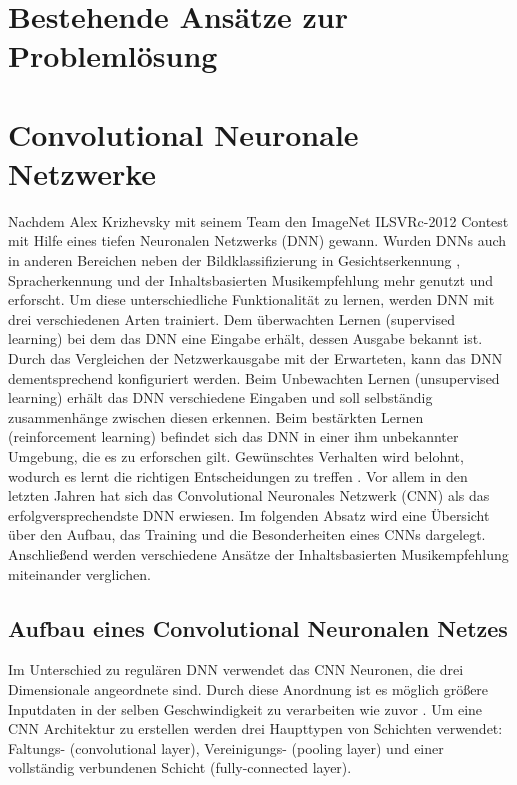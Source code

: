 \documentclass[twosided,a4,10pt]{article}
\begin{document}
\begin{multicols}{2}
\section{Bestehende Ansätze zur Problemlösung}



\section{Convolutional Neuronale Netzwerke}
Nachdem Alex Krizhevsky mit seinem Team den ImageNet ILSVRc-2012 Contest mit Hilfe eines tiefen Neuronalen Netzwerks (DNN) gewann. Wurden DNNs auch in anderen Bereichen neben der Bildklassifizierung \cite{alex} in Gesichtserkennung \cite{ding}, Spracherkennung \cite{graves} und der Inhaltsbasierten Musikempfehlung \cite{oord} mehr genutzt und erforscht.\newline
Um diese unterschiedliche Funktionalität zu lernen, werden DNN mit drei verschiedenen Arten trainiert. Dem überwachten Lernen (supervised learning) bei dem das DNN eine Eingabe erhält, dessen Ausgabe bekannt ist. Durch das Vergleichen der Netzwerkausgabe mit der Erwarteten, kann das DNN dementsprechend konfiguriert werden. Beim Unbewachten Lernen (unsupervised learning) erhält das DNN verschiedene Eingaben und soll selbständig zusammenhänge zwischen diesen erkennen. Beim bestärkten Lernen (reinforcement learning) befindet sich das DNN in einer ihm unbekannter Umgebung, die es zu erforschen gilt. Gewünschtes Verhalten wird belohnt, wodurch es lernt die richtigen Entscheidungen zu treffen \cite{wang2}.\newline 
Vor allem in den letzten Jahren hat sich das Convolutional Neuronales Netzwerk (CNN) als das erfolgversprechendste DNN erwiesen.\newline 
Im folgenden Absatz wird eine Übersicht über den Aufbau, das Training und die Besonderheiten eines CNNs dargelegt. Anschließend werden verschiedene Ansätze der Inhaltsbasierten Musikempfehlung miteinander verglichen.

\subsection{Aufbau eines Convolutional Neuronalen Netzes}
Im Unterschied zu regulären DNN verwendet das CNN Neuronen, die drei Dimensionale angeordnete sind. Durch diese Anordnung ist es möglich größere Inputdaten in der selben Geschwindigkeit zu verarbeiten wie zuvor \cite{karpathy}. Um eine CNN Architektur zu erstellen werden drei Haupttypen von Schichten verwendet: Faltungs- (convolutional layer), Vereinigungs- (pooling layer) und einer vollständig verbundenen Schicht (fully-connected layer).


\end{multicols}
\end{document}
